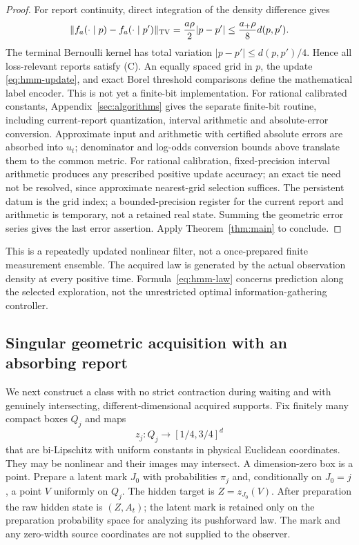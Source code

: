 \begin{proof}
For report continuity, direct integration of the density difference gives
\[
 \lVert f_a(\cdot\mid p)-f_a(\cdot\mid p')\rVert_{\mathrm{TV}}
 =\frac{a\rho}{2}|p-p'|\le\frac{a_+\rho}{8}d(p,p').
\]
The terminal Bernoulli kernel has total variation $|p-p'|\le d(p,p')/4$. Hence all loss-relevant reports satisfy \textup{(C)}. An equally spaced grid in $p$, the update \eqref{eq:hmm-update}, and exact Borel threshold comparisons define the mathematical label encoder. This is not yet a finite-bit implementation. For rational calibrated constants, Appendix~\ref{sec:algorithms} gives the separate finite-bit routine, including current-report quantization, interval arithmetic and absolute-error conversion. Approximate input and arithmetic with certified absolute errors are absorbed into $u_t$; denominator and log-odds conversion bounds above translate them to the common metric. For rational calibration, fixed-precision interval arithmetic produces any prescribed positive update accuracy; an exact tie need not be resolved, since approximate nearest-grid selection suffices. The persistent datum is the grid index; a bounded-precision register for the current report and arithmetic is temporary, not a retained real state. Summing the geometric error series gives the last error assertion. Apply Theorem~\ref{thm:main} to conclude.
\end{proof}

This is a repeatedly updated nonlinear filter, not a once-prepared finite measurement ensemble. The acquired law is generated by the actual observation density at every positive time. Formula~\eqref{eq:hmm-law} concerns prediction along the selected exploration, not the unrestricted optimal information-gathering controller.

\subsection{Singular geometric acquisition with an absorbing report}\label{sec:sensor}
We next construct a class with no strict contraction during waiting and with genuinely intersecting, different-dimensional acquired supports. Fix finitely many compact boxes $Q_j$ and maps
\[
 z_j:Q_j\longrightarrow[1/4,3/4]^d
\]
that are bi-Lipschitz with uniform constants in physical Euclidean coordinates. They may be nonlinear and their images may intersect. A dimension-zero box is a point. Prepare a latent mark $J_0$ with probabilities $\pi_j$ and, conditionally on $J_0=j$, a point $V$ uniformly on $Q_j$. The hidden target is $Z=z_{J_0}(V)$. After preparation the raw hidden state is $(Z,A_t)$; the latent mark is retained only on the preparation probability space for analyzing its pushforward law. The mark and any zero-width source coordinates are not supplied to the observer.

